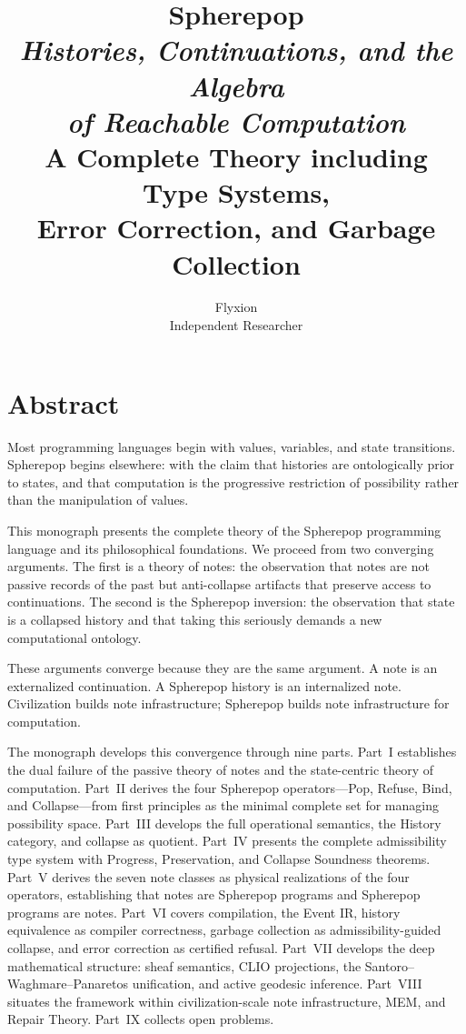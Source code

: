 \documentclass[12pt, a4paper, openany]{book}
\title{
  \vspace{2cm}
  {\Huge\bfseries Spherepop}\\[1em]
  {\large\itshape Histories, Continuations, and the Algebra\\
  of Reachable Computation}\\[3em]
  {\normalsize A Complete Theory including Type Systems,\\
  Error Correction, and Garbage Collection}
}
\author{Flyxion\\[0.5em]\small Independent Researcher}
\date{}
\theoremstyle{plain}
\theoremstyle{definition}
\theoremstyle{remark}
\begin{document}
\maketitle
\thispagestyle{empty}

\frontmatter

\chapter*{Abstract}

Most programming languages begin with values, variables, and state transitions.
Spherepop begins elsewhere: with the claim that histories are ontologically prior
to states, and that computation is the progressive restriction of possibility rather
than the manipulation of values.

This monograph presents the complete theory of the Spherepop programming language
and its philosophical foundations. We proceed from two converging arguments. The
first is a theory of notes: the observation that notes are not passive records of
the past but anti-collapse artifacts that preserve access to continuations. The
second is the Spherepop inversion: the observation that state is a collapsed
history and that taking this seriously demands a new computational ontology.

These arguments converge because they are the same argument. A note is an
externalized continuation. A Spherepop history is an internalized note. Civilization
builds note infrastructure; Spherepop builds note infrastructure for computation.

The monograph develops this convergence through nine parts. Part~I establishes
the dual failure of the passive theory of notes and the state-centric theory of
computation. Part~II derives the four Spherepop operators---Pop, Refuse, Bind, and
Collapse---from first principles as the minimal complete set for managing possibility
space. Part~III develops the full operational semantics, the History category, and
collapse as quotient. Part~IV presents the complete admissibility type system with
Progress, Preservation, and Collapse Soundness theorems. Part~V derives the
seven note classes as physical realizations of the four operators, establishing
that notes are Spherepop programs and Spherepop programs are notes. Part~VI covers
compilation, the Event IR, history equivalence as compiler correctness, garbage
collection as admissibility-guided collapse, and error correction as certified
refusal. Part~VII develops the deep mathematical structure: sheaf semantics, CLIO
projections, the Santoro--Waghmare--Panaretos unification, and active geodesic
inference. Part~VIII situates the framework within civilization-scale note
infrastructure, MEM, and Repair Theory. Part~IX collects open problems.
\end{document}
